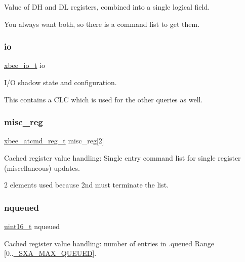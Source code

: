 Value of DH and DL registers, combined into a single logical field. 

You always want both, so there is a command list to get them. \mbox{\label{structsxa__node__t_a87711fd12194e90fe58291cf2ea6e30f}} 
\subsubsection{\texorpdfstring{io}{io}}
{\footnotesize\ttfamily \hyperlink{structxbee__io__t}{xbee\+\_\+io\+\_\+t} io}



I/O shadow state and configuration. 

This contains a C\+LC which is used for the other queries as well. \mbox{\label{structsxa__node__t_ae825a2809f705ef65c961e8bfe3e98cc}} 
\subsubsection{\texorpdfstring{misc\+\_\+reg}{misc\_reg}}
{\footnotesize\ttfamily \hyperlink{structxbee__atcmd__reg__t}{xbee\+\_\+atcmd\+\_\+reg\+\_\+t} misc\+\_\+reg\mbox{[}2\mbox{]}}



Cached register value handling\+: Single entry command list for single register (miscellaneous) updates. 

2 elements used because 2nd must terminate the list. \mbox{\label{structsxa__node__t_a8de35431542d2c2508bb17ac8fa48a84}} 
\subsubsection{\texorpdfstring{nqueued}{nqueued}}
{\footnotesize\ttfamily \hyperlink{group__hal__dos_ga5a8b2dc9e45a9ee81a94ef304fb62505}{uint16\+\_\+t} nqueued}



Cached register value handling\+: number of entries in .queued Range \mbox{[}0..\hyperlink{sxa_8h_a9e47d5fe0e89846d0bc2b3f1584382ae}{\+\_\+\+S\+X\+A\+\_\+\+M\+A\+X\+\_\+\+Q\+U\+E\+U\+ED}\mbox{]}. 

